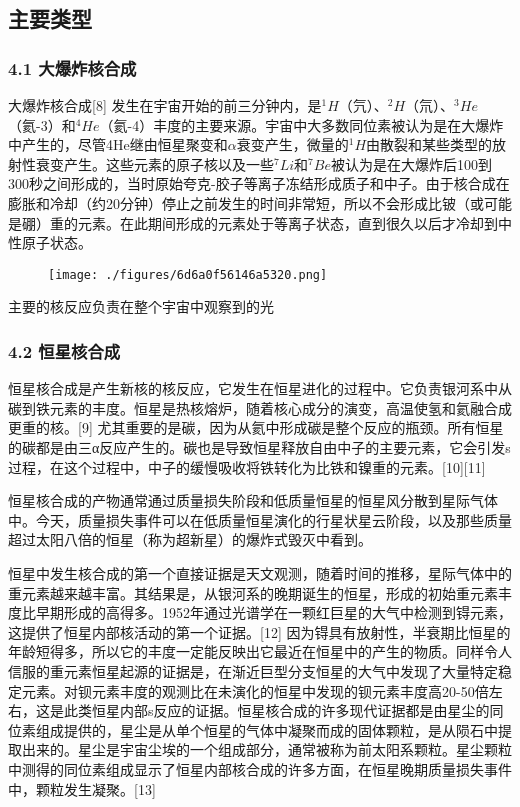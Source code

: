 \subsection{主要类型}
\subsubsection{4.1 大爆炸核合成}
大爆炸核合成[8] 发生在宇宙开始的前三分钟内，是$^1H$（氕）、$^2H$（氘）、$^3He$（氦-3）和$^4He$（氦-4）丰度的主要来源。宇宙中大多数同位素被认为是在大爆炸中产生的，尽管4He继由恒星聚变和$\alpha$衰变产生，微量的$^1H$由散裂和某些类型的放射性衰变产生。这些元素的原子核以及一些$^7Li$和$^7Be$被认为是在大爆炸后100到300秒之间形成的，当时原始夸克-胶子等离子冻结形成质子和中子。由于核合成在膨胀和冷却（约20分钟）停止之前发生的时间非常短，所以不会形成比铍（或可能是硼）重的元素。在此期间形成的元素处于等离子状态，直到很久以后才冷却到中性原子状态。
\begin{figure}[ht]
\centering
\texttt{[image: ./figures/6d6a0f56146a5320.png]}
\caption{} \label{fig_HHC_3}
\end{figure}
主要的核反应负责在整个宇宙中观察到的光
\subsubsection{4.2 恒星核合成}
恒星核合成是产生新核的核反应，它发生在恒星进化的过程中。它负责银河系中从碳到铁元素的丰度。恒星是热核熔炉，随着核心成分的演变，高温使氢和氦融合成更重的核。[9] 尤其重要的是碳，因为从氦中形成碳是整个反应的瓶颈。所有恒星的碳都是由三α反应产生的。碳也是导致恒星释放自由中子的主要元素，它会引发s过程，在这个过程中，中子的缓慢吸收将铁转化为比铁和镍重的元素。[10][11]

恒星核合成的产物通常通过质量损失阶段和低质量恒星的恒星风分散到星际气体中。今天，质量损失事件可以在低质量恒星演化的行星状星云阶段，以及那些质量超过太阳八倍的恒星（称为超新星）的爆炸式毁灭中看到。

恒星中发生核合成的第一个直接证据是天文观测，随着时间的推移，星际气体中的重元素越来越丰富。其结果是，从银河系的晚期诞生的恒星，形成的初始重元素丰度比早期形成的高得多。1952年通过光谱学在一颗红巨星的大气中检测到锝元素，这提供了恒星内部核活动的第一个证据。[12] 因为锝具有放射性，半衰期比恒星的年龄短得多，所以它的丰度一定能反映出它最近在恒星中的产生的物质。同样令人信服的重元素恒星起源的证据是，在渐近巨型分支恒星的大气中发现了大量特定稳定元素。对钡元素丰度的观测比在未演化的恒星中发现的钡元素丰度高20-50倍左右，这是此类恒星内部s反应的证据。恒星核合成的许多现代证据都是由星尘的同位素组成提供的，星尘是从单个恒星的气体中凝聚而成的固体颗粒，是从陨石中提取出来的。星尘是宇宙尘埃的一个组成部分，通常被称为前太阳系颗粒。星尘颗粒中测得的同位素组成显示了恒星内部核合成的许多方面，在恒星晚期质量损失事件中，颗粒发生凝聚。[13]
